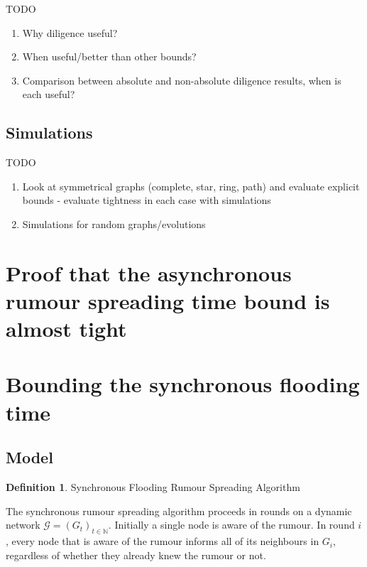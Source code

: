\documentclass[a4paper,11pt]{article}
\theoremstyle{definition}
\newtheorem{definition}[theorem]{Definition}
\begin{document}
TODO

\begin{enumerate}
	\item Why diligence useful?
	\item When useful/better than other bounds?
	\item Comparison between absolute and non-absolute  diligence results, when is each useful?
\end{enumerate}

\subsection{Simulations}

TODO 

\begin{enumerate}
	\item Look at symmetrical graphs (complete, star, ring, path) and evaluate explicit bounds - evaluate tightness in each case with simulations
	\item Simulations for random graphs/evolutions
\end{enumerate}

\section{Proof that the asynchronous rumour spreading time bound is almost tight}
\label{AsyncLowerBoundSection}

\section{Bounding the synchronous flooding time}
\label{SyncFloodingSection}

\subsection{Model}

\begin{definition} \label{SyncFloodingAlgorithm}
	Synchronous Flooding Rumour Spreading Algorithm

	\noindent
	The synchronous rumour spreading algorithm proceeds in rounds on a dynamic network $\mathcal{G} = (G_t)_{t \in \mathbb{N}}$. Initially a single node is aware of the rumour. In round $i$, every node that is aware of the rumour informs all of its neighbours in $G_i$, regardless of whether they already knew the rumour or not.
\end{definition}
\end{document}
